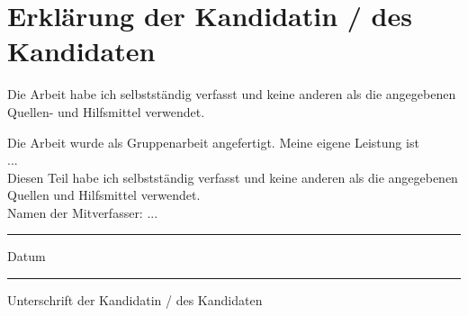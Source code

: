 \chapter{Erklärung der Kandidatin / des Kandidaten}

\begin{description}[$\Box$~]
\item[$\Box$] Die Arbeit habe ich selbstständig verfasst und keine anderen als die angegebenen Quellen- und Hilfsmittel verwendet.\\

\item[$\Box$] Die Arbeit wurde als Gruppenarbeit angefertigt. Meine eigene Leistung ist\\
...\\

Diesen Teil habe ich selbstständig verfasst und keine anderen als die angegebenen Quellen und Hilfsmittel verwendet. \\

Namen der Mitverfasser: ...

\end{description}

\vspace{2cm}

\begin{minipage}[t]{3cm}
\rule{3cm}{0.5pt}
Datum
\end{minipage}
\hfill
\begin{minipage}[t]{9cm}
\rule{9cm}{0.5pt}
Unterschrift der Kandidatin / des Kandidaten
\end{minipage}